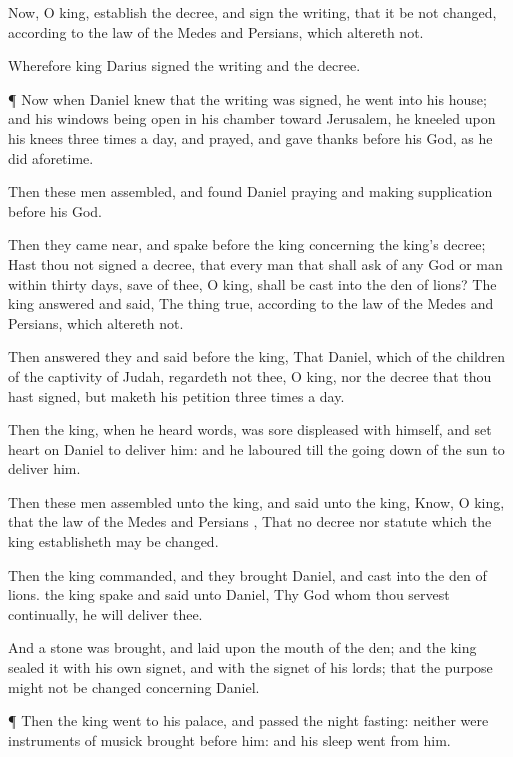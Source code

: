 {Now, O
king,
establish the
decree, and
sign the
writing, that it be
not
changed, according to the
law of the
Medes and
Persians, which
altereth
not.

Wherefore
king
Darius
signed the
writing and the
decree.


\par }{\PP {}¶ Now when
Daniel
knew that the
writing was
signed, he
went into his
house; and his
windows being
open in his
chamber
toward
Jerusalem, he
kneeled
upon his
knees
three
times a
day, and
prayed, and gave
thanks
before his
God,
as he
did
aforetime.


\par }{\PP {}Then
these
men
assembled, and
found
Daniel
praying and making
supplication
before his
God.

Then they came
near, and
spake
before the
king
concerning the
king’s
decree; Hast thou
not
signed a
decree, that
every
man that shall
ask
{}
of
any
God or
man
within
thirty
days,
save of
thee, O
king, shall be
cast into the
den of
lions? The
king
answered and
said, The
thing
{}
true, according to the
law of the
Medes and
Persians, which
altereth
not.

Then
answered they and
said
before the
king, That
Daniel, which
{}
of the
children of the
captivity of
Judah,
regardeth
not
thee, O
king, nor the
decree that thou hast
signed, but
maketh his
petition
three
times a
day.

Then the
king, when he
heard
{}
words, was
sore
displeased with himself, and
set
{}
heart
on
Daniel to
deliver him: and he
laboured
till the going
down of the
sun to
deliver him.

Then
these
men
assembled
unto the
king, and
said unto the
king,
Know, O
king, that the
law of the
Medes and
Persians
{}, That
no
decree nor
statute which the
king
establisheth may be
changed.

Then the
king
commanded, and they
brought
Daniel, and
cast
{} into the
den of
lions.
{} the
king
spake and
said unto
Daniel, Thy
God whom
thou
servest
continually, he will
deliver thee.

And
a
stone was
brought, and
laid
upon the
mouth of the
den; and the
king
sealed it with his own
signet, and with the
signet of his
lords; that the
purpose might
not be
changed concerning
Daniel.


\par }{\PP {}¶
Then the
king
went to his
palace, and passed the
night
fasting:
neither were
instruments of musick
brought
before him: and his
sleep
went from
him.

}
